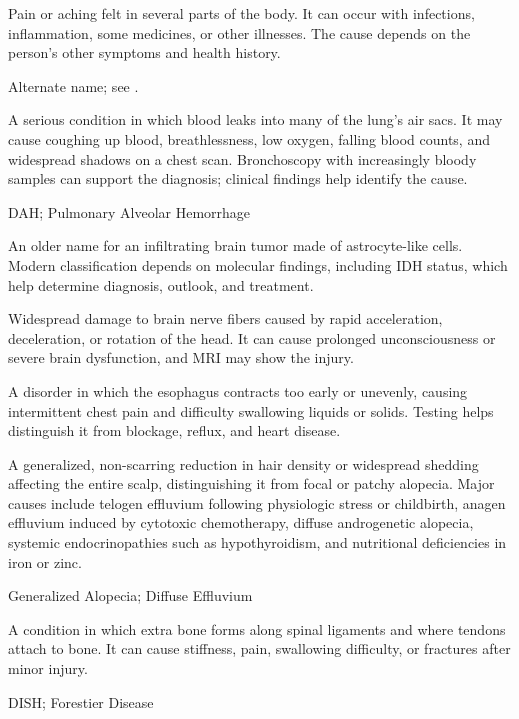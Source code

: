  Pain or aching felt in several parts of the body. It can occur with infections, inflammation, some medicines, or other illnesses. The cause depends on the person’s other symptoms and health history.

 Alternate name; see .

 A serious condition in which blood leaks into many of the lung’s air sacs. It may cause coughing up blood, breathlessness, low oxygen, falling blood counts, and widespread shadows on a chest scan. Bronchoscopy with increasingly bloody samples can support the diagnosis; clinical findings help identify the cause.

\synonyms
DAH; Pulmonary Alveolar Hemorrhage

 An older name for an infiltrating brain tumor made of astrocyte-like cells. Modern classification depends on molecular findings, including IDH status, which help determine diagnosis, outlook, and treatment.

 Widespread damage to brain nerve fibers caused by rapid acceleration, deceleration, or rotation of the head. It can cause prolonged unconsciousness or severe brain dysfunction, and MRI may show the injury.

 A disorder in which the esophagus contracts too early or unevenly, causing intermittent chest pain and difficulty swallowing liquids or solids. Testing helps distinguish it from blockage, reflux, and heart disease.

 A generalized, non-scarring reduction in hair density or widespread shedding affecting the entire scalp, distinguishing it from focal or patchy alopecia. Major causes include telogen effluvium following physiologic stress or childbirth, anagen effluvium induced by cytotoxic chemotherapy, diffuse androgenetic alopecia, systemic endocrinopathies such as hypothyroidism, and nutritional deficiencies in iron or zinc.

\synonyms
Generalized Alopecia; Diffuse Effluvium

 A condition in which extra bone forms along spinal ligaments and where tendons attach to bone. It can cause stiffness, pain, swallowing difficulty, or fractures after minor injury.

\synonyms
DISH; Forestier Disease

